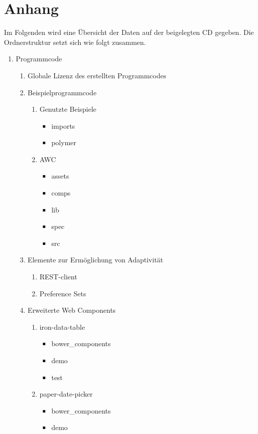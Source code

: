 \documentclass[12pt, paper=a4, bibtotoc, toc=listof, headsepline=true, numbers=endperiod]{scrreprt}
\begin{document}
\chapter*{Anhang}
Im Folgenden wird eine Übersicht der Daten auf der beigelegten CD gegeben. Die Ordnerstruktur setzt sich wie folgt zusammen.
\begin{enumerate}
	\item Programmcode
	\begin{enumerate}
		\item Globale Lizenz des erstellten Programmcodes
		\item Beispielprogrammcode
		\begin{enumerate}
			\item Genutzte Beispiele
				\begin{itemize}
					\item imports
					\item polymer
				\end{itemize}
			\item AWC
			\begin{itemize}
				\item assets
				\item comps
				\item lib
				\item spec
				\item src
			\end{itemize}
		\end{enumerate}
		\item Elemente zur Ermöglichung von Adaptivität
		\begin{enumerate}
			\item REST-client
			\item Preference Sets
		\end{enumerate} 
		\item Erweiterte Web Components
		\begin{enumerate}
			\item iron-data-table 
			\begin{itemize}
				\item bower\_components
				\item demo
				\item test
			\end{itemize}
			\item paper-date-picker
			\begin{itemize}
				\item bower\_components
				\item demo

\end{itemize}
\end{enumerate}
\end{enumerate}
\end{enumerate}
\end{document}
